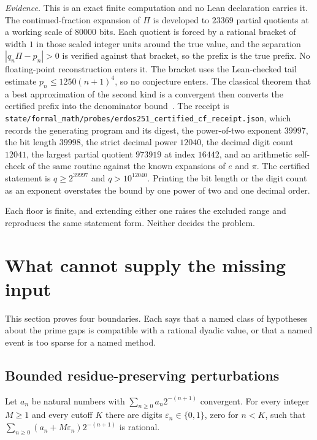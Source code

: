 \emph{Evidence.}  This is an exact finite computation and no Lean declaration
carries it.  The continued-fraction expansion of $\Pi$ is developed to $23369$
partial quotients at a working scale of $80000$ bits.  Each quotient is forced
by a rational bracket of width $1$ in those scaled integer units around the
true value, and the separation $|q_n\Pi-p_n|>0$ is verified against that
bracket, so the prefix is the true prefix.  No floating-point reconstruction
enters it.  The bracket uses the Lean-checked tail estimate
$p_n\le1250(n+1)^4$, so no conjecture enters.  The classical theorem that a
best approximation of the second kind is a convergent then converts the
certified prefix into the denominator bound~\cite{khinchin1964}.  The receipt
is \texttt{state/formal\_math/probes/erdos251\_certified\_cf\_receipt.json},
which records the generating program and its digest, the power-of-two exponent
$39997$, the bit length $39998$, the strict decimal power $12040$, the decimal
digit count $12041$, the largest partial quotient $973919$ at index $16442$,
and an arithmetic self-check of the same routine against the known expansions
of $e$ and $\pi$.  The certified statement is $q\ge2^{39997}$ and
$q>10^{12040}$.  Printing the bit length or the digit count as an exponent
overstates the bound by one power of two and one decimal order.

Each floor is finite, and extending either one raises the excluded range and
reproduces the same statement form.  Neither decides the problem.

\section{What cannot supply the missing input}\label{long251:sec:obstructions}

This section proves four boundaries.  Each says that a named class of
hypotheses about the prime gaps is compatible with a rational dyadic value, or
that a named event is too sparse for a named method.

\subsection{Bounded residue-preserving perturbations}

\begin{theorem}\label{long251:res:boundedperturbation}
Let $a_n$ be natural numbers with $\sum_{n\ge0}a_n2^{-(n+1)}$ convergent.  For
every integer $M\ge1$ and every cutoff $K$ there are digits
$\varepsilon_n\in\{0,1\}$, zero for $n<K$, such that
$\sum_{n\ge0}(a_n+M\varepsilon_n)2^{-(n+1)}$ is rational.
\end{theorem}

